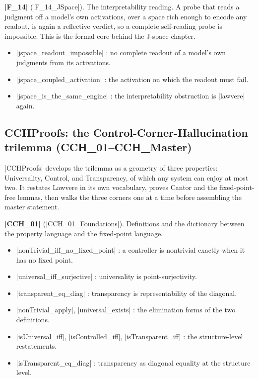 \documentclass{memoir}
\begin{document}
\textbf{\LeanVerb|F_14|} (\LeanVerb|F_14_JSpace|). The interpretability reading. A probe that reads a
judgment off a model's own activations, over a space rich enough to encode any
readout, is again a reflective verdict, so a complete self-reading probe is
impossible. This is the formal core behind the J-space chapter.

\begin{itemize}
\item \LeanVerb|jspace_readout_impossible| : no complete readout of a model's own judgments from
   its activations.
\item \LeanVerb|jspace_coupled_activation| : the activation on which the readout must fail.
\item \LeanVerb|jspace_is_the_same_engine| : the interpretability obstruction is \LeanVerb|lawvere|
   again.

\end{itemize}




\subsection{CCHProofs: the Control-Corner-Hallucination trilemma (CCH\_01–CCH\_Master)}\label{Two--Schemas--of--Impossibility-005F-005F-005F--Machine--Checked--Limits--of--Trustworthy--Machine--Learning-005F-005F-005F--and--Why--They--Tighten--with--Capability----Appendices----The--Formal--Corpus----CCHProofs-005F-005F-005F--the--Control--Corner--Hallucination--trilemma---005FLPAR-005FCCH-005F01-005F-005F-005FCCH-005FMaster-005FRPAR-005F}

\LeanVerb|CCHProofs| develops the trilemma as a geometry of three properties: Universality,
Control, and Transparency, of which any system can enjoy at most two. It restates
Lawvere in its own vocabulary, proves Cantor and the fixed-point-free lemmas, then
walks the three corners one at a time before assembling the master statement.

\textbf{\LeanVerb|CCH_01|} (\LeanVerb|CCH_01_Foundations|). Definitions and the dictionary between the
property language and the fixed-point language.

\begin{itemize}
\item \LeanVerb|nonTrivial_iff_no_fixed_point| : a controller is nontrivial exactly when it has
   no fixed point.
\item \LeanVerb|universal_iff_surjective| : universality is point-surjectivity.
\item \LeanVerb|transparent_eq_diag| : transparency is representability of the diagonal.
\item \LeanVerb|nonTrivial_apply|, \LeanVerb|universal_exists| : the elimination forms of the two
   definitions.
\item \LeanVerb|isUniversal_iff|, \LeanVerb|isControlled_iff|, \LeanVerb|isTransparent_iff| : the structure-level
   restatements.
\item \LeanVerb|isTransparent_eq_diag| : transparency as diagonal equality at the structure
   level.

\end{itemize}
\end{document}
